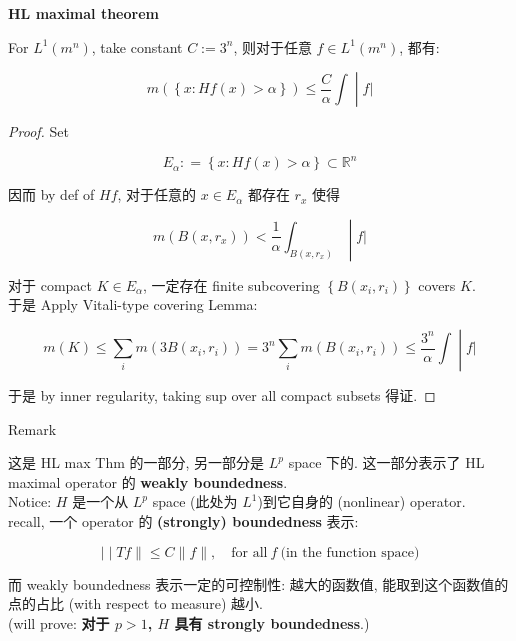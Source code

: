 \documentclass{qlnotes-export}
\begin{document}
\begin{theorem}{\protect{}\label{kn-hl-maximal-theorem}{\textbf{HL maximal
theorem}}}

For \(L^{1}(m^{n})\), take constant \(C := 3^{n}\), 则对于任意 \(f \in L^{1}(m^{n})\), 都有:

\[\left. m(\left\{ {x:Hf(x) > \alpha} \right\}) \leq \frac{C}{\alpha}\int \middle| f| \right.\]

\end{theorem}

\begin{proof}

Set

\[E_{\alpha}: = \left\{ {x:Hf(x) > \alpha} \right\} \subset {\mathbb{R}}^{n}\]

因而 by def of \(Hf\), 对于任意的 \(x \in E_{\alpha}\) 都存在 \(r_{x}\) 使得

\[\left. m(B(x,r_{x})) < \frac{1}{\alpha}\int_{B(x,r_{x})} \middle| f| \right.\]

对于 compact \(K \in E_{\alpha}\), 一定存在 finite subcovering \(\left\{ {B(x_{i},r_{i})} \right\}\) covers \(K\).\\
于是 Apply Vitali-type covering Lemma:

\[\left. m(K) \leq \sum\limits_{i}m(3B(x_{i},r_{i})) = 3^{n}\sum\limits_{i}m(B(x_{i},r_{i})) \leq \frac{3^{n}}{\alpha}\int \middle| f| \right.\]

于是 by inner regularity, taking sup over all compact subsets 得证.

\end{proof}

\begin{qlremark}{Remark}

这是 HL max Thm 的一部分, 另一部分是 \(L^{p}\) space 下的. 这一部分表示了 HL maximal operator 的 \textbf{weakly boundedness}.\\
Notice: \(H\) 是一个从 \(L^{p}\) space (此处为 \(L^{1}\))到它自身的 (nonlinear) operator.\\
recall, 一个 operator 的 \textbf{(strongly) boundedness} 表示:

\[\left. | \middle| Tf \parallel \leq C \parallel f \parallel ,\quad\text{for all}\ f\ \text{(in the function space)} \right.\]

而 weakly boundedness 表示一定的可控制性: 越大的函数值, 能取到这个函数值的点的占比 (with respect to measure) 越小.\\
(will prove: \textbf{对于 \(p > 1\), \(H\) 具有 strongly boundedness}.)

\end{qlremark}
\end{document}
